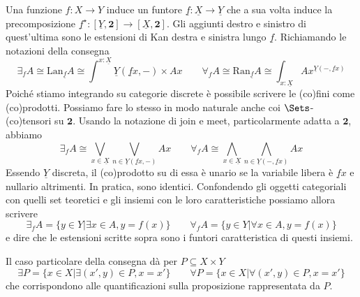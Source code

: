 Una funzione $f:X\rightarrow Y$ induce un funtore $\underline{f}:\underline{X}\rightarrow\underline{Y}$ che a sua volta induce la precomposizione $\underline{f}^\star:[\underline{Y},\mathbf{2}]\rightarrow[\underline{X},\mathbf{2}]$. Gli aggiunti destro e sinistro di quest'ultima sono le estensioni di Kan destra e sinistra lungo $\underline{f}$. Richiamando le notazioni della consegna
\[
\exists_f A
\cong
\text{Lan}_{\underline{f}}A
\cong
\int^{x:\underline{X}}\underline{Y}(\underline{f}x,-)\times Ax
\qquad
\forall_f A
\cong
\text{Ran}_{\underline{f}}A
\cong
\int_{x:\underline{X}}Ax^{\underline{Y}(-,\underline{f}x)}
\]
Poiché stiamo integrando su categorie discrete è possibile scrivere le (co)fini come (co)prodotti. Possiamo fare lo stesso in modo naturale anche coi $\Sets$-(co)tensori su $\mathbf{2}$. Usando la notazione di join e meet, particolarmente adatta a $\mathbf{2}$, abbiamo
\[
\exists_f A
\cong
\bigvee_{x\in\underline{X}} \bigvee_{n\in\underline{Y}(\underline{f}x,-)} Ax
\qquad
\forall_f A
\cong
\bigwedge_{x\in\underline{X}} \bigwedge_{n\in\underline{Y}(-,\underline{f}x)} Ax
\]
Essendo $\underline{Y}$ discreta, il (co)prodotto su di essa è unario se la variabile libera è $\underline{f}x$ e nullario altrimenti. In pratica, sono identici. Confondendo gli oggetti categoriali con quelli set teoretici e gli insiemi con le loro caratteristiche possiamo allora scrivere
\[
\exists_f A
=
\{y\in Y \vert \exists x\in A, y=f(x)\}
\qquad
\forall_f A
=
\{y\in Y \vert \forall x\in A, y=f(x)\}
\]
e dire che le estensioni scritte sopra sono i funtori caratteristica di questi insiemi.

Il caso particolare della consegna dà per $P\subseteq X\times Y$
\[
\exists P
=
\{x\in X \vert \exists (x',y)\in P, x=x'\}
\qquad
\forall P
=
\{x\in X \vert \forall (x',y)\in P, x=x'\}
\]
che corrispondono alle quantificazioni sulla proposizione rappresentata da $P$.

